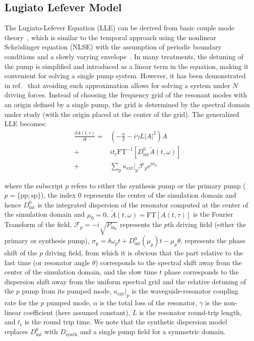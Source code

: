 \documentclass[reprint,superscriptaddress, amsmath,amssymb,pra, aps,floatfix,longbibliography]{revtex4-1}
\begin{document}
\subsection{Lugiato Lefever Model}
\label{sub:sup-lle}
The Lugiato-Lefever Equation (LLE) can be derived from basic couple mode theory~\cite{hansson_numerical_2014, chembo_spatiotemporal_2013}, which is similar to the temporal approach using the nonlinear Schr\"odinger equation (NLSE) with the assumption of periodic boundary conditions and a slowly varying envelope~\cite{coen_modeling_2012}. In many treatments, the detuning of the pump is simplified and introduced as a linear term in the equation, making it convenient for solving a single pump system. However, it has been demonstrated in ref.~\cite{taheri_optical_2017} that avoiding such approximation allows for solving a system under $N$ driving forces. Instead of choosing the frequency grid of the resonant modes with an origin defined by a single pump, the grid is determined by the spectral domain under study (with the origin placed at the center of the grid). The generalized LLE becomes:
\begin{align}
 \label{sup-eq:LLE}
 \frac{\partial A(t, \tau)}{\partial t} = & \left(-\frac{\alpha}{2} - i\gamma L |A|^2 \right)A                                          \\
 +                                        & i t_\mathrm{r} \mathrm{FT}^{-1}\left[D_\mathrm{int}^{0}\tilde{A}(t,\omega)\right] \nonumber \\
 +                                        &
 \sum_\mathrm{p}\kappa_\mathrm{ext}|_\mathrm{p} \mathcal{F}_p  \mathrm{e}^{i\sigma_\mathrm{p}} \nonumber
\end{align}


\noindent where the subscript $p$ refers to either the synthesis pump or the primary pump ($p=\{\mathrm{pp}; \mathrm{sp}\}$), the index $0$ represents the center of the simulation domain and hence $D_\mathrm{int}^{0}$ is the integrated dispersion of the resonator computed at the center of the simulation domain and $\mu_0 = 0$, $\tilde{A}(t, \omega) =\mathrm{FT}\left[{A}(t, \tau)\right]$ is the Fourier Transform of the field,  $\mathcal{F}_p = -i\sqrt{P_\mathrm{in_p}}$ represents the $p$th driving field (either the primary or synthesis pump), $\sigma_\mathrm{p} = \delta\omega_p t + D_\mathrm{int}^{0}(\mu_p)t - \mu_p\theta$, represents the phase shift of the $p$ driving field, from which it is obvious that the part relative to the fast time (or resonator angle $\theta$) corresponds to the spectral shift away from the center of the simulation domain, and the slow time $t$ phase corresponds to the dispersion shift away from the uniform spectral grid and the relative detuning of the $p$ pump from its pumped mode, $\kappa_\mathrm{ext}|_\mathrm{p}$ is the waveguide-resonator coupling rate for  the $p$ pumped mode,  $\alpha$ is the total loss of the resonator, $\gamma$ is the non-linear coefficient (here assumed constant), $L$ is the resonator round-trip length, and $t_\mathrm{r}$ is the round trip time. We note that the synthetic dispersion model replaces $D_\mathrm{int}^{0}$ with $D_\mathrm{synth}$ and a single pump field for a symmetric domain.
\end{document}
